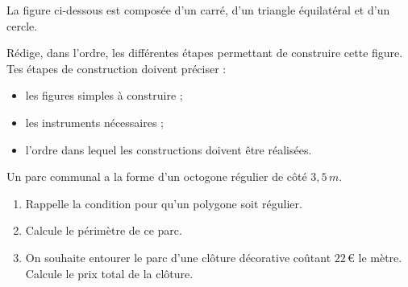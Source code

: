 \documentclass[../../syllabus_1.tex]{subfiles}
\begin{document}
\newpage
\begin{exercise}
    La figure ci-dessous est composée d'un carré, d'un triangle
    équilatéral et d'un cercle.

    \begin{center}
    \end{center}

    Rédige, dans l'ordre, les différentes étapes permettant
        de construire cette figure.
    Tes étapes de construction doivent préciser :
        \begin{itemize}
            \item les figures simples à construire ;
            \item les instruments nécessaires ;
            \item l'ordre dans lequel les constructions doivent être
            réalisées.
        \end{itemize}
\end{exercise}

\begin{exercise}
    Un parc communal a la forme d'un octogone régulier de côté $3,5\,m$.
    \begin{enumerate}
        \item Rappelle la condition pour qu'un polygone soit régulier.
        \item Calcule le périmètre de ce parc.
        \item On souhaite entourer le parc d'une clôture décorative coûtant $22\,$€ le mètre. Calcule le prix total de la clôture.
    \end{enumerate}
\end{exercise}
\end{document}
